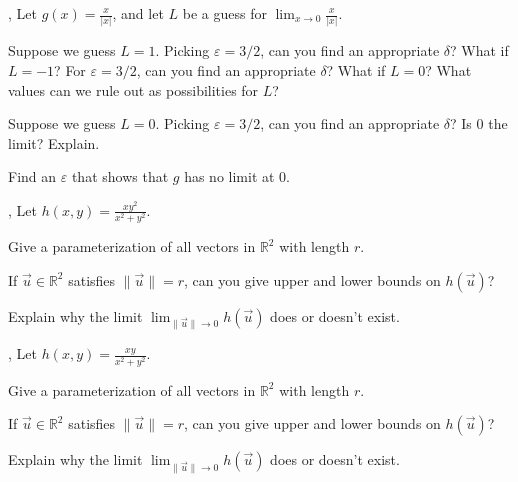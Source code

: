 \documentclass[letter]{article}
\newcommand{\R}{\mathbb{R}}
\begin{document}
	\sep
	Let $g(x) = \frac{x}{|x|}$, and let $L$ be a guess for $\lim_{x\to 0} \frac{x}{|x|}$.
	\begin{Enum}
		\item Suppose we guess $L=1$.  Picking $\varepsilon = 3/2$, can you find an appropriate
			$\delta$?  What if $L=-1$?  For $\varepsilon=3/2$, can you find an appropriate $\delta$?
			What if $L=0$?  What values can we rule out as possibilities for $L$?
		\item Suppose we guess $L=0$.  Picking $\varepsilon=3/2$, can you find an appropriate $\delta$?
			Is $0$ the limit?  Explain.
		\item Find an $\varepsilon$ that shows that $g$ has no limit at $0$.
	\end{Enum}

	\sep
	Let $h(x,y) = \frac{xy^2}{x^2+y^2}$.
	\begin{Enum}
		\item Give a parameterization of all vectors in $\R^2$ with length $r$.
		\item If $\vec u\in \R^2$ satisfies $\|\vec u\|=r$, can you give upper
			and lower bounds on $h(\vec u)$?
		\item Explain why the limit $\displaystyle \lim_{\|\vec u\|\to 0} h(\vec u)$
			does or doesn't exist.
	\end{Enum}
	\sep
	Let $h(x,y) = \frac{xy}{x^2+y^2}$.
	\begin{Enum}
		\item Give a parameterization of all vectors in $\R^2$ with length $r$.
		\item If $\vec u\in \R^2$ satisfies $\|\vec u\|=r$, can you give upper
			and lower bounds on $h(\vec u)$?
		\item Explain why the limit $\displaystyle \lim_{\|\vec u\|\to 0} h(\vec u)$
			does or doesn't exist.
	\end{Enum}




%
%
%
\end{document}
